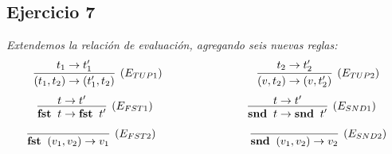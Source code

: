 \documentclass[a4paper,10pt]{article}
\begin{document}
\pagebreak
\subsection*{Ejercicio 7} 
	\emph{Extendemos la relación de evaluación, agregando seis nuevas reglas:}
	\\
	\begin{align*}
		\infer[(E_{TUP1})]{
			(t_{1},t_{2}) \rightarrow (t_{1}',t_{2})
		}{
			t_{1} \rightarrow t_{1}'
		} \hspace{3cm}
		\infer[(E_{TUP2})]{
			(v,t_{2}) \rightarrow (v,t_{2}')
		}{
			t_{2} \rightarrow t_{2}'
		}
	\end{align*}
	\begin{align*}
		\infer[(E_{FST1})]{
			{\bf fst}\;\;t \rightarrow {\bf fst}\;\;t'
		}{
			t \rightarrow t'
		} \hspace{3cm}
		\infer[(E_{SND1})]{
			{\bf snd}\;\;t \rightarrow {\bf snd}\;\;t'
		}{
			t \rightarrow t'
		}
	\end{align*}
	\begin{align*}
		\infer[(E_{FST2})]{
			{\bf fst}\;\;(v_{1},v_{2}) \rightarrow v_{1}
		}{
		} \hspace{3cm}
		\infer[(E_{SND2})]{
			{\bf snd}\;\;(v_{1},v_{2}) \rightarrow v_{2}
		}{
		}
	\end{align*}
	\\
	\\
	\\	
\end{document}
